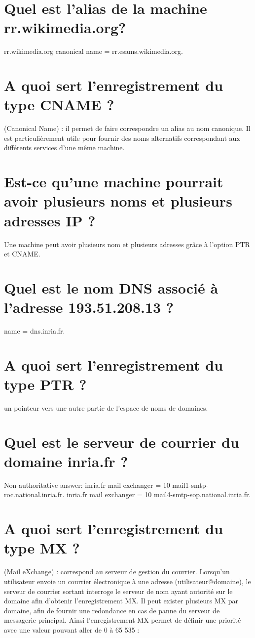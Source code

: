 \section{Quel est l'alias de la machine rr.wikimedia.org?}
rr.wikimedia.org	canonical name = rr.esams.wikimedia.org. 

\section{A quoi sert l'enregistrement du type CNAME ?}
(Canonical Name) : il permet de faire correspondre un alias au nom canonique. Il est particulièrement utile pour fournir des noms alternatifs correspondant aux différents services d'une même machine.

\section{Est-ce qu'une machine pourrait avoir plusieurs noms et plusieurs adresses IP ?}
Une machine peut avoir plusieurs nom et plusieurs adresses grâce à l'option PTR et CNAME.


\section{Quel est le nom DNS associé à l'adresse 193.51.208.13 ?}
 	name = dns.inria.fr. 
\section{A quoi sert l'enregistrement du type PTR ?}
un pointeur vers une autre partie de l'espace de noms de domaines. 
\section{Quel est le serveur de courrier du domaine inria.fr ?}
Non-authoritative answer: 
inria.fr	mail exchanger = 10 mail1-smtp-roc.national.inria.fr. 
inria.fr	mail exchanger = 10 mail4-smtp-sop.national.inria.fr.



\section{A quoi sert l'enregistrement du type MX ?}
(Mail eXchange) : correspond au serveur de gestion du courrier. Lorsqu'un utilisateur envoie un courrier électronique à une adresse (utilisateur@domaine), le serveur de courrier sortant interroge le serveur de nom ayant autorité sur le domaine afin d'obtenir l'enregistrement MX. Il peut exister plusieurs MX par domaine, afin de fournir une redondance en cas de panne du serveur de messagerie principal. Ainsi l'enregistrement MX permet de définir une priorité avec une valeur pouvant aller de 0 à 65 535 : 
